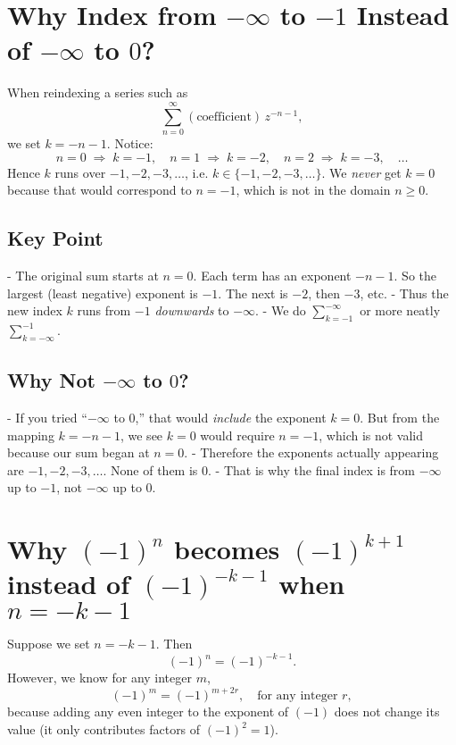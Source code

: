 \documentclass[12pt]{article}
\theoremstyle{definition} %
\theoremstyle{plain} %
\begin{document}
\section*{Why Index from \(-\infty\) to \(-1\) Instead of \(-\infty\) to \(0\)?}

When reindexing a series such as
\[
\sum_{n=0}^\infty (\text{coefficient}) \, z^{-n-1},
\]
we set \(k = -n - 1\). Notice:
\[
n = 0 \;\Longrightarrow\; k = -1,\quad
n = 1 \;\Longrightarrow\; k = -2,\quad
n = 2 \;\Longrightarrow\; k = -3,\quad \dots
\]
Hence \(k\) runs over \(-1, -2, -3, \dots\), i.e. \(k\in\{-1,-2,-3,\ldots\}\). We \emph{never} get \(k=0\) because that would correspond to \(n=-1\), which is not in the domain \(n\ge0\).

\subsection*{Key Point}

- The original sum starts at \(n=0\). Each term has an exponent \(-n-1\). So the largest (least negative) exponent is \(-1\). The next is \(-2\), then \(-3\), etc.
- Thus the new index \(k\) runs from \(-1\) \emph{downwards} to \(-\infty\). 
- We do \(\sum_{k=-1}^{-\infty}\) or more neatly \(\sum_{k=-\infty}^{-1}\).

\subsection*{Why Not \(-\infty\) to \(0\)?}

- If you tried “\(-\infty\) to \(0\),” that would \emph{include} the exponent \(k=0\). But from the mapping \(k=-n-1\), we see \(k=0\) would require \(n=-1\), which is not valid because our sum began at \(n=0\). 
- Therefore the exponents actually appearing are \(-1, -2, -3, \dots\). None of them is \(0\). 
- That is why the final index is from \(-\infty\) up to \(-1\), not \(-\infty\) up to \(0\).
\section*{Why \((-1)^n\) becomes \((-1)^{k+1}\) instead of \((-1)^{-k-1}\) when \(n=-k-1\)}

Suppose we set \(n=-k-1\). Then
\[
(-1)^n = (-1)^{-k-1}.
\]
However, we know for any integer \(m\),
\[
(-1)^m = (-1)^{m+2r}, \quad \text{for any integer } r,
\]
because adding any even integer to the exponent of \((-1)\) does not change its value (it only contributes factors of \((-1)^2=1\)).
\end{document}
